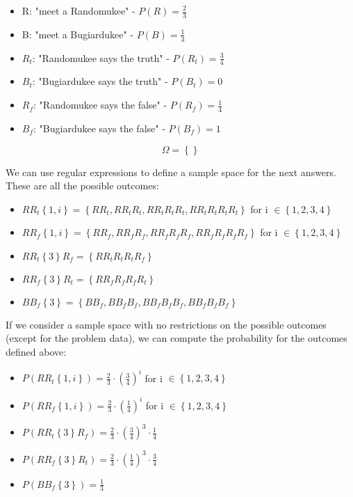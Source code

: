 \documentclass{article}
\begin{document}
\begin{itemize}
	\item R: "meet a Randomukee" - $P(R) = \frac {2} {3}$
	\item B: "meet a Bugiardukee" - $P(B) = \frac {1} {3}$
	\item $R_{t}$: "Randomukee says the truth" - $P(R_{t}) = \frac {3} {4}$
	\item $B_{t}$: "Bugiardukee says the truth" - $P(B_{t}) = 0$
	\item $R_{f}$: "Randomukee says the false" - $P(R_{f}) = \frac {1} {4}$
	\item $B_{f}$: "Bugiardukee says the false" - $P(B_{f}) = 1$
\end{itemize}

\begin{equation} \label{eq:sampleSpace2}
\Omega =  \left\{    \right\}
\end{equation}


We can use regular expressions to define a sample space for the next answers. These are all the possible outcomes:

\begin{itemize}	
	\item $ RR_{t}\left\{1,i\right\} = \left\{ RR_{t}, RR_{t}R_{t}, RR_{t}R_{t}R_{t}, RR_{t}R_{t}R_{t}R_{t} \right\} $ 	\space\space\space	   for i $\in \left\{ 1, 2, 3, 4 \right\} $
	\item $ RR_{f}\left\{1,i\right\} = \left\{ RR_{f}, RR_{f}R_{f}, RR_{f}R_{f}R_{f}, RR_{f}R_{f}R_{f}R_{f} \right\} $ 	\space\space\space	   for i $\in \left\{ 1, 2, 3, 4 \right\} $
	\item $ RR_{t}\left\{ 3 \right\}R_{f} = \left\{ RR_{t}R_{t}R_{t}R_{f} \right\} $
	\item $ RR_{f}\left\{ 3 \right\}R_{t} = \left\{ RR_{f}R_{f}R_{f}R_{t} \right\} $
	\item $ BB_{f}\left\{ 3 \right\} = \left\{ BB_{f}, BB_{f}B_{f}, BB_{f}B_{f}B_{f}, BB_{f}B_{f}B_{f} \right\} $			
\end{itemize}

If we consider a sample space with no restrictions on the possible outcomes (except for the problem data), we can compute the probability for the outcomes defined above:

\begin{itemize}
	\item $ P(RR_{t}\left\{1,i\right\}) = \frac {2}{3} \cdot \left( \frac {3}{4} \right)^{i} $ 		\space\space\space	   for i $\in \left\{ 1, 2, 3, 4 \right\} $
	\item $ P(RR_{f}\left\{1,i\right\}) = \frac {2}{3} \cdot \left( \frac {1}{4} \right)^{i} $ 		\space\space\space	   for i $\in \left\{ 1, 2, 3, 4 \right\} $
	\item $ P(RR_{t}\left\{ 3 \right\}R_{f}) = \frac {2}{3} \cdot \left( \frac {3}{4} \right)^{3} \cdot \frac {1}{4} $
	\item $ P(RR_{f}\left\{ 3 \right\}R_{t}) = \frac {2}{3} \cdot \left( \frac {1}{4} \right)^{3} \cdot \frac {3}{4} $
	\item $ P(BB_{f}\left\{ 3 \right\}) = \frac {1} {3} $
\end{itemize}
\end{document}
